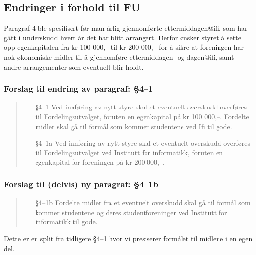 \documentclass[10pt,norsk,a4paper]{article}
\begin{document}
\subsection{Endringer i forhold til FU}
Paragraf 4 ble spesifisert før man årlig gjennomførte ettermiddagen@ifi, som har gått i underskudd hvert år det har blitt arrangert. Derfor ønsker styret å sette opp egenkapitalen fra kr 100 000,– til kr 200 000,– for å sikre at foreningen har nok økonomiske midler til å gjennomføre ettermiddagen- og dagen@ifi, samt andre arrangementer som eventuelt blir holdt.

\subsubsection{Forslag til endring av paragraf: §4--1}
\begin{quote}
	\begin{enumerate}
        \item[§4--1] Ved innføring av nytt styre skal et eventuelt overskudd overføres til Fordelingsutvalget, foruten en egenkapital på kr 100 000,–. Fordelte midler skal gå til formål som kommer studentene ved Ifi til gode.
        \item[§4--1a] Ved innføring av nytt styre skal et eventuelt overskudd overføres til Fordelingsutvalget ved Institutt for informatikk, foruten en egenkapital for foreningen på kr 200 000,–.
	\end{enumerate}
\end{quote}

\subsubsection{Forslag til (delvis) ny paragraf: §4--1b}
\begin{quote}
	\begin{enumerate}
		\item[§4--1b] Fordelte midler fra et eventuelt overskudd skal gå til formål som kommer studentene og deres studentforeninger ved Institutt for informatikk til gode.
	\end{enumerate}
\end{quote}\label{lastpage}
Dette er en split fra tidligere §4--1 hvor vi presiserer formålet til midlene i en egen del.

\newpage

\end{document}
